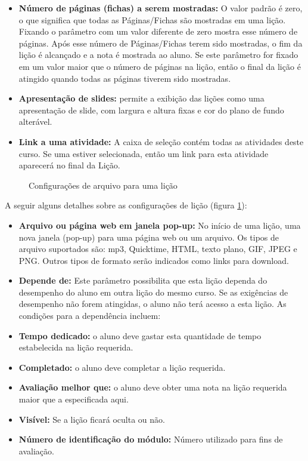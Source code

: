 \begin{itemize}
 \item \textbf{Número de páginas (fichas) a serem mostradas:} O valor padrão é zero, o que significa que todas as Páginas/Fichas são mostradas em uma lição. Fixando o parâmetro com um valor diferente de zero mostra esse número de páginas. Após esse número de Páginas/Fichas terem sido mostradas, o fim da lição é alcançado e a nota é mostrada ao aluno. Se este parâmetro for fixado em um valor maior que o número de páginas na lição, então o final da lição é atingido quando todas as páginas tiverem sido mostradas.
 \item \textbf{Apresentação de slides:} permite a exibição das lições como uma apresentação de slide, com largura e altura fixas e cor do plano de fundo alterável.
 \item \textbf{Link a uma atividade:} A caixa de seleção contém todas as atividades deste curso. Se uma estiver selecionada, então um link para esta atividade aparecerá no final da Lição.
\end{itemize}

\begin{figure}
 \begin{center}
  \caption{Configurações de arquivo para uma lição}
  \label{fig:conf_arq_licao}
 \end{center}
\end{figure}


A seguir alguns detalhes sobre as configurações de lição (figura \ref{fig:conf_arq_licao}):

\begin{itemize}
 \item \textbf{Arquivo ou página web em janela pop-up:} No início de uma lição, uma nova janela (pop-up) para uma página web ou um arquivo. Os tipos de arquivo suportados são: mp3, Quicktime, HTML, texto plano, GIF, JPEG e PNG. Outros tipos de formato serão indicados como links para download.
 \item \textbf{Depende de:} Este parâmetro possibilita que esta lição dependa do desempenho do aluno em outra lição do mesmo curso. Se as exigências de desempenho não forem atingidas, o aluno não terá acesso a esta lição. As condições para a dependência incluem:
 \item \textbf{Tempo dedicado:} o aluno deve gastar esta quantidade de tempo estabelecida na lição requerida.
 \item \textbf{Completado:} o aluno deve completar a lição requerida.
 \item \textbf{Avaliação melhor que:} o aluno deve obter uma nota na lição requerida maior que a especificada aqui.
 \item \textbf{Visível:} Se a lição ficará oculta ou não.
 \item \textbf{Número de identificação do módulo:} Número utilizado para fins de avaliação.
\end{itemize}

